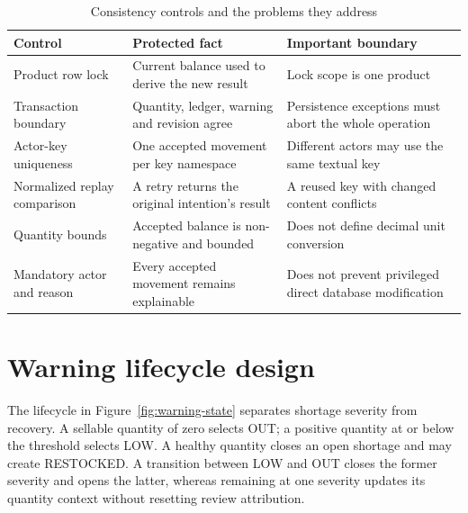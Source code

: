 \begin{table}[htbp]\centering\small{}\setlength{\tabcolsep}{3pt}\renewcommand{\arraystretch}{1.25}
\caption{Consistency controls and the problems they address}\label{tab:stock-consistency}
\begin{tabular}{>{\raggedright\arraybackslash}p{}>{\raggedright\arraybackslash}p{}>{\raggedright\arraybackslash}p{}}
\toprule
\textbf{Control} & \textbf{Protected fact} & \textbf{Important boundary} \\
\midrule
\leavevmode{}Product row lock & \leavevmode{}Current balance used to derive the new result & \leavevmode{}Lock scope is one product \\
\leavevmode{}Transaction boundary & \leavevmode{}Quantity, ledger, warning and revision agree & \leavevmode{}Persistence exceptions must abort the whole operation \\
\leavevmode{}Actor-key uniqueness & \leavevmode{}One accepted movement per key namespace & \leavevmode{}Different actors may use the same textual key \\
\leavevmode{}Normalized replay comparison & \leavevmode{}A retry returns the original intention's result & \leavevmode{}A reused key with changed content conflicts \\
\leavevmode{}Quantity bounds & \leavevmode{}Accepted balance is non-negative and bounded & \leavevmode{}Does not define decimal unit conversion \\
\leavevmode{}Mandatory actor and reason & \leavevmode{}Every accepted movement remains explainable & \leavevmode{}Does not prevent privileged direct database modification \\
\bottomrule\end{tabular}\end{table}

\FloatBarrier

\section{Warning lifecycle design}

The lifecycle in Figure~\ref{fig:warning-state} separates shortage severity from recovery. A sellable quantity of zero selects OUT; a positive quantity at or below the threshold selects LOW. A healthy quantity closes an open shortage and may create RESTOCKED. A transition between LOW and OUT closes the former severity and opens the latter, whereas remaining at one severity updates its quantity context without resetting review attribution.


